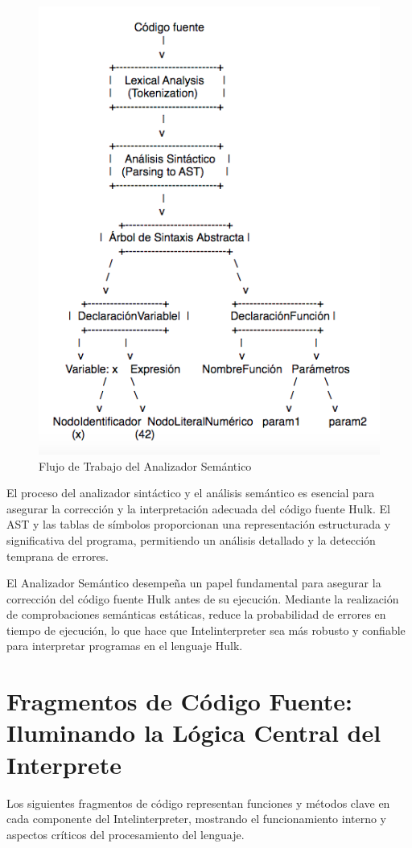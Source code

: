 \documentclass{article}
\begin{document}
\begin{figure}[h]
    \centering
    \includegraphics[scale=0.6]{images/ast.png} %
    \caption{Flujo de Trabajo del Analizador Semántico}
    \label{fig:ast}
\end{figure}

El proceso del analizador sintáctico y el análisis semántico es esencial para asegurar la corrección y la interpretación adecuada del código fuente Hulk. El AST y las tablas de símbolos proporcionan una representación estructurada y significativa del programa, permitiendo un análisis detallado y la detección temprana de errores.

El Analizador Semántico desempeña un papel fundamental para asegurar la corrección del código fuente Hulk antes de su ejecución. Mediante la realización de comprobaciones semánticas estáticas, reduce la probabilidad de errores en tiempo de ejecución, lo que hace que Intelinterpreter sea más robusto y confiable para interpretar programas en el lenguaje Hulk.


\section{Fragmentos de Código Fuente: Iluminando la Lógica Central del Interprete}
Los siguientes fragmentos de código representan funciones y métodos clave en cada componente del Intelinterpreter, mostrando el funcionamiento interno y aspectos críticos del procesamiento del lenguaje.
\end{document}
